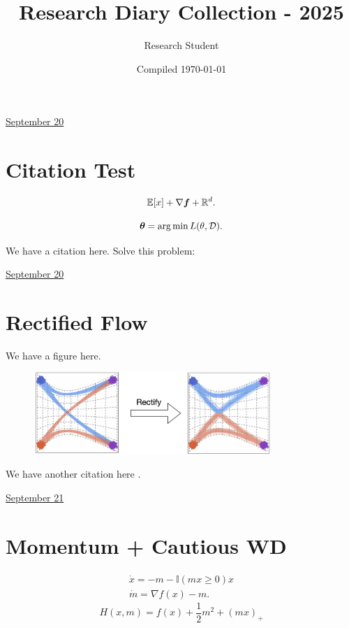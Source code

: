 \documentclass[letterpaper,11pt]{article}
\title{Research Diary Collection - 2025}
\author{Research Student}
\date{Compiled \today}
\begin{document}
\tableofcontents
\thispagestyle{empty}
\newpage


\href{run:2025-09-20-newmethod.tex}{\Huge September 20} 


\section{Citation Test}


$$
\mathbb{E}[x] + \nabla\boldsymbol{f} +  \mathbb{R}^d. 
$$

$$
\boldsymbol{\theta} = \operatorname*{arg\,min} L(\theta, \mathcal D).
$$

We have a citation \cite{research_methods2024} here.  Solve this problem: 



\clearpage


\href{run:2025-09-20.tex}{\Huge September 20} 

\section{Rectified Flow}

We have a figure here. 
\begin{figure}[h]
\centering 
\includegraphics[width=0.8\textwidth]{assets/figures/2025/curved_reflow.png}
\end{figure} 


We have another citation here \cite{li2022diffusion}. 


\clearpage


\href{run:2025-09-21-momentum_cwd.tex}{\Huge September 21} 

\section{Momentum + Cautious WD}

\begin{align}
    \dot x = - m - \mathbb{I}(mx\geq 0) x \\ 
    \dot m = \nabla f(x) - m. 
\end{align}
$$
H(x, m) = f(x) + \frac{1}{2} m^2 + (mx)_+
$$
\end{document}
